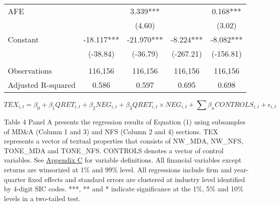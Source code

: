\begin{table}[H]
\begin{center}
\begin{tabular}{lcccc}
			AFE &   & 3.339*** &   & 0.168*** \\
			&   & (4.60) &   & (3.02) \\
			Constant & -18.117*** & -21.970*** & -8.224*** & -8.082*** \\
			& (-38.84) & (-36.79) & (-267.21) & (-156.81) \\
			&   &   &   &  \\
			Observations & 116,156 & 116,156 & 116,156 & 116,156 \\
			Adjusted R-squared & 0.586 & 0.597 & 0.695 & 0.698 \\
			\bottomrule
			\bottomrule
		\end{tabular}%
	\end{center}
\begin{footnotesize}
	\setcounter{equation}{0}
	\begin{equation}
		TEX_{i,t}=\beta_0+\beta_1QRET_{i,t}+\beta_2NEG_{i,t}+\beta_3QRET_{i,t}\times NEG_{i,t}+\sum\beta_nCONTROLS_{i,t}+\epsilon_{i,t}
	\end{equation}
	
	\noindent Table 4 Panel A presents the regression results of Equation (1) using subsamples of MD\&A (Column 1 and 3) and NFS (Column 2 and 4) sections. TEX represents a vector of textual properties that consists of NW\_MDA, NW\_NFS, TONE\_MDA and TONE\_NFS. CONTROLS denotes a vector of control variables. See \hyperref[appc]{Appendix C} for variable definitions. All financial variables except returns are winsorized at 1\% and 99\% level. All regressions include firm and year-quarter fixed effects and standard errors are clustered at industry level identified by 4-digit SIC codes. ***, ** and * indicate significance at the 1\%, 5\% and 10\% levels in a two-tailed test.
\end{footnotesize}
\end{table}%